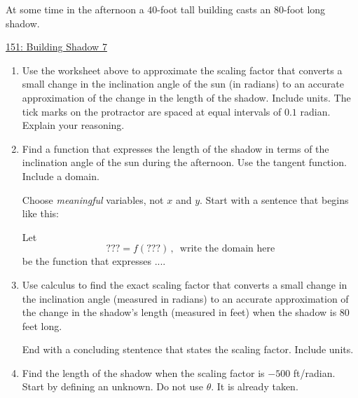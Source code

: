 \documentclass{ximera}
\begin{document}
\begin{exercise} \label{ExKdm4090}
At some time in the afternoon a $40$-foot tall building casts an $80$-foot long shadow.

\begin{onlineOnly}
    \begin{center}
\end{center}
\end{onlineOnly}

\href{https://www.desmos.com/calculator/5qqd2t4eny}{151: Building Shadow 7}

\begin{enumerate}
\item Use the worksheet above to approximate the scaling factor that converts a small change in the inclination angle of the sun (in radians) to an accurate approximation of the change in the length of the shadow. Include units. The tick marks on the protractor are spaced at equal intervals of $0.1$ radian. Explain your reasoning.

\item Find a function that expresses the length of the shadow in terms of the inclination angle of the sun during the afternoon. Use the tangent function. Include a domain.

Choose \emph{meaningful} variables, not $x$ and $y$. Start with a sentence that begins like this:

Let 
\[
    ???  =   f( ???) \, , \,   \text{ write the domain here}
\] 
be the function that expresses ....

\item Use calculus to find the exact scaling factor that converts a small change in the inclination angle (measured in radians) to an accurate approximation of the change in the shadow's length (measured in feet) when the shadow is $80$ feet long.

End with a concluding stentence that states the scaling factor. Include units.

\item Find the length of the shadow when the scaling factor is $-500$ ft/radian. Start by defining an unknown. Do not use $\theta$. It is already taken.
\end{enumerate}


\end{exercise}
\end{document}
